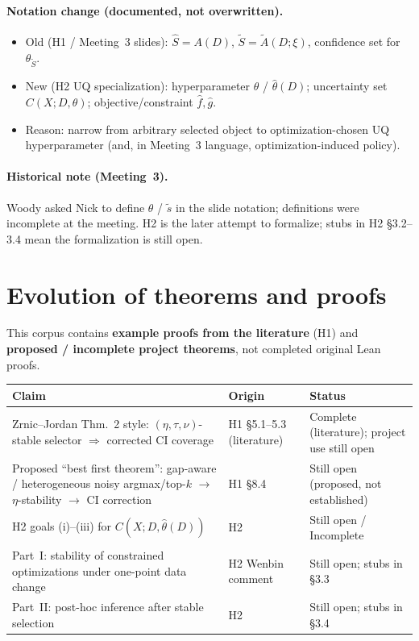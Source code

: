\documentclass[11pt]{article}
\begin{document}
\paragraph{Notation change (documented, not overwritten).}
\begin{itemize}[leftmargin=*]
  \item Old (H1 / Meeting~3 slides): $\hat S=A(D)$, $\tilde S=\tilde A(D;\xi)$, confidence set
        for $\theta_{\tilde S}$.
  \item New (H2 UQ specialization): hyperparameter $\theta$ / $\hat\theta(D)$; uncertainty set
        $C(X;D,\theta)$; objective/constraint $\hat f,\hat g$.
  \item Reason: narrow from arbitrary selected object to optimization-chosen UQ hyperparameter
        (and, in Meeting~3 language, optimization-induced policy).
\end{itemize}

\paragraph{Historical note (Meeting~3).}
Woody asked Nick to define $\theta$ / $\tilde s$ in the slide notation; definitions were
incomplete at the meeting. H2 is the later attempt to formalize; stubs in H2 \S3.2--3.4 mean
the formalization is still open.

\section{Evolution of theorems and proofs}

This corpus contains \textbf{example proofs from the literature} (H1) and
\textbf{proposed / incomplete project theorems}, not completed original Lean proofs.

\begin{center}
\begin{tabularx}{\linewidth}{@{}l >{\RaggedRight\arraybackslash}X l@{}}
\toprule
\textbf{Claim} & \textbf{Origin} & \textbf{Status} \\
\midrule
Zrnic--Jordan Thm.~2 style:
$(\eta,\tau,\nu)$-stable selector $\Rightarrow$ corrected CI coverage &
H1 \S5.1--5.3 (literature) &
Complete (literature); project use still open \\
\addlinespace
Proposed ``best first theorem'':
gap-aware / heterogeneous noisy argmax/top-$k$ $\to$ $\eta$-stability $\to$ CI correction &
H1 \S8.4 &
Still open (proposed, not established) \\
\addlinespace
H2 goals (i)--(iii) for $C(X;D,\hat\theta(D))$ &
H2 &
Still open / Incomplete \\
\addlinespace
Part~I: stability of constrained optimizations under one-point data change &
H2 Wenbin comment &
Still open; stubs in \S3.3 \\
\addlinespace
Part~II: post-hoc inference after stable selection &
H2 &
Still open; stubs in \S3.4 \\
\bottomrule
\end{tabularx}
\end{center}
\end{document}
